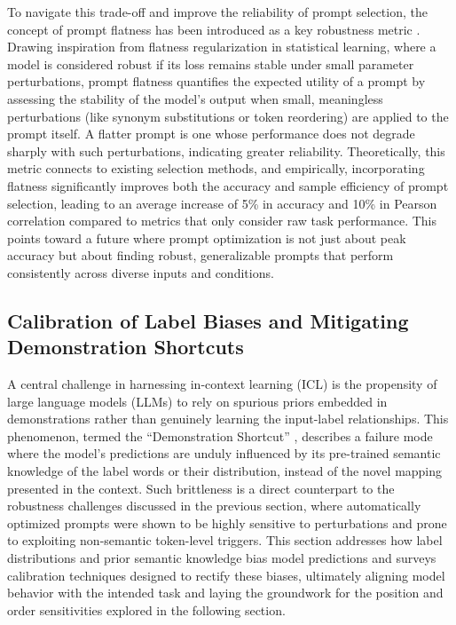 \documentclass[11pt]{article}
\begin{document}
To navigate this trade-off and improve the reliability of prompt selection, the concept of prompt flatness has been introduced as a key robustness metric \cite{ref175}. Drawing inspiration from flatness regularization in statistical learning, where a model is considered robust if its loss remains stable under small parameter perturbations, prompt flatness quantifies the expected utility of a prompt by assessing the stability of the model's output when small, meaningless perturbations (like synonym substitutions or token reordering) are applied to the prompt itself. A flatter prompt is one whose performance does not degrade sharply with such perturbations, indicating greater reliability. Theoretically, this metric connects to existing selection methods, and empirically, incorporating flatness significantly improves both the accuracy and sample efficiency of prompt selection, leading to an average increase of 5\% in accuracy and 10\% in Pearson correlation compared to metrics that only consider raw task performance. This points toward a future where prompt optimization is not just about peak accuracy but about finding robust, generalizable prompts that perform consistently across diverse inputs and conditions.

\subsection{Calibration of Label Biases and Mitigating Demonstration Shortcuts}

A central challenge in harnessing in-context learning (ICL) is the propensity of large language models (LLMs) to rely on spurious priors embedded in demonstrations rather than genuinely learning the input-label relationships. This phenomenon, termed the ``Demonstration Shortcut'' \cite{ref23}, describes a failure mode where the model's predictions are unduly influenced by its pre-trained semantic knowledge of the label words or their distribution, instead of the novel mapping presented in the context. Such brittleness is a direct counterpart to the robustness challenges discussed in the previous section, where automatically optimized prompts were shown to be highly sensitive to perturbations and prone to exploiting non-semantic token-level triggers. This section addresses how label distributions and prior semantic knowledge bias model predictions and surveys calibration techniques designed to rectify these biases, ultimately aligning model behavior with the intended task and laying the groundwork for the position and order sensitivities explored in the following section.
\end{document}
